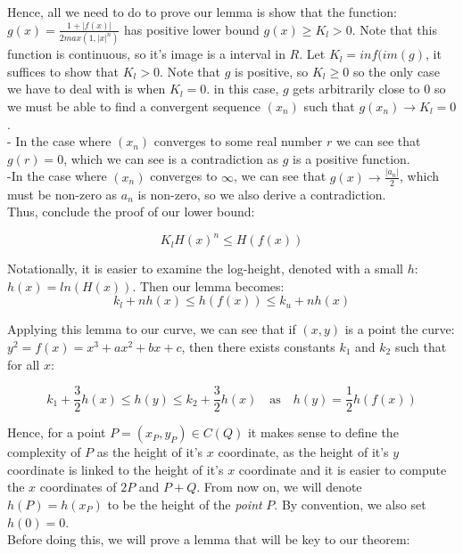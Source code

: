 \documentclass{article}
\begin{document}
Hence, all we need to do to prove our lemma is show that the function: $g(x) = \frac{1 + |f(x)|}{2 max(1, |x|^n)}$ has positive lower bound $g(x) \geq K_l > 0$. Note that this function is continuous, so it's image is a interval in $R$. Let $K_l = inf(im(g)$, it suffices to show that $K_l > 0$. Note that $g$ is positive, so $K_l \geq 0$ so the only case we have to deal with is when $K_l = 0$. in this case, $g$ gets arbitrarily close to $0$ so we must be able to find a convergent sequence $(x_n)$ such that $g(x_n) \rightarrow K_l = 0$. \\

- In the case where $(x_n)$ converges to some real number $r$ we can see that $g(r) = 0$, which we can see is a contradiction as $g$ is a positive function.\\

-In the case where $(x_n)$ converges to $\infty$, we can see that $g(x) \rightarrow \frac{|a_n|}{2}$, which must be non-zero as $a_n$ is non-zero, so we also derive a contradiction.\\

Thus, conclude the proof of our lower bound:

\[ K_l H(x)^n \leq H(f(x)) \]

Notationally, it is easier to examine the log-height, denoted with a small $h$: $h(x) = ln(H(x))$. Then our lemma becomes: \\

\[k_l + n h(x) \leq h(f(x)) \leq k_u + n h(x) \]

Applying this lemma to our curve, we can see that if $(x, y)$ is a point the curve: $y^2 = f(x) = x^3 + ax^2 + bx + c$, then there exists constants $k_1$ and $k_2$ such that for all $x$:

\[ k_1 + \frac{3}{2} h(x) \leq h(y) \leq k_2 + \frac{3}{2} h(x) \quad \text{as} \quad h(y) = \frac{1}{2}h(f(x)) \]

Hence, for a point $P = (x_P, y_P) \in C(Q)$ it makes sense to define the complexity of $P$ as the height of it's $x$ coordinate, as the height of it's $y$ coordinate is linked to the height of it's $x$ coordinate and it is easier to compute the $x$ coordinates of $2P$ and $P + Q$. From now on, we will denote $h(P) = h(x_P)$ to be the height of the \emph{point} $P$. By convention, we also set $h(0) = 0$.\\

Before doing this, we will prove a lemma that will be key to our theorem:\\
\end{document}
